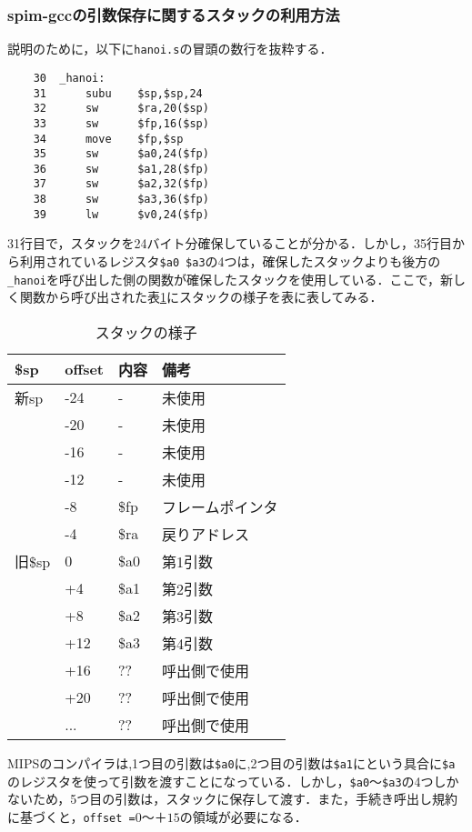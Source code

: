 \documentclass[a4j,11pt]{jarticle}
\begin{document}
  \subsubsection{spim-gccの引数保存に関するスタックの利用方法}
説明のために，以下に\verb|hanoi.s|の冒頭の数行を抜粋する．
\begin{verbatim}
    30	_hanoi:
    31		subu	$sp,$sp,24
    32		sw	    $ra,20($sp)
    33		sw	    $fp,16($sp)
    34		move	$fp,$sp
    35		sw	    $a0,24($fp)
    36		sw	    $a1,28($fp)
    37		sw	    $a2,32($fp)
    38		sw	    $a3,36($fp)
    39		lw	    $v0,24($fp)
\end{verbatim}
31行目で，スタックを24バイト分確保していることが分かる．しかし，35行目から利用されているレジスタ\verb|$a0|~\verb|$a3|の4つは，確保したスタックよりも後方の\verb|_hanoi|を呼び出した側の関数が確保したスタックを使用している．ここで，新しく関数から呼び出された表\ref{tab:stack}にスタックの様子を表に表してみる．
\begin{table}[htb]
\label{tab:stack}
\centering
\begin{tabular}{|l|l|l|l|}
\hline
\$sp  & offset & 内容   & 備考       \\ \hline
新sp   & -24    & -    & 未使用      \\ \hline
      & -20    & -    & 未使用      \\ \hline
      & -16    & -    & 未使用      \\ \hline
      & -12    & -    & 未使用      \\ \hline
      & -8     & \$fp & フレームポインタ \\ \hline
      & -4     & \$ra & 戻りアドレス   \\ \hline
旧\$sp & 0      & \$a0 & 第1引数     \\ \hline
      & +4     & \$a1 & 第2引数     \\ \hline
      & +8     & \$a2 & 第3引数     \\ \hline
      & +12    & \$a3 & 第4引数     \\ \hline
      & +16    & ??   & 呼出側で使用   \\ \hline
      & +20    & ??   & 呼出側で使用   \\ \hline
      & ...    & ??   & 呼出側で使用   \\ \hline
\end{tabular}
\caption{スタックの様子}
\end{table}
MIPSのコンパイラは,1つ目の引数は\verb|$a0|に,2つ目の引数は\verb|$a1|にという具合に\verb|$a|のレジスタを使って引数を渡すことになっている．しかし，\verb|$a0|〜\verb|$a3|の4つしかないため，5つ目の引数は，スタックに保存して渡す．また，手続き呼出し規約に基づくと，\verb|offset =|$0$〜＋$15$の領域が必要になる．
\end{document}
